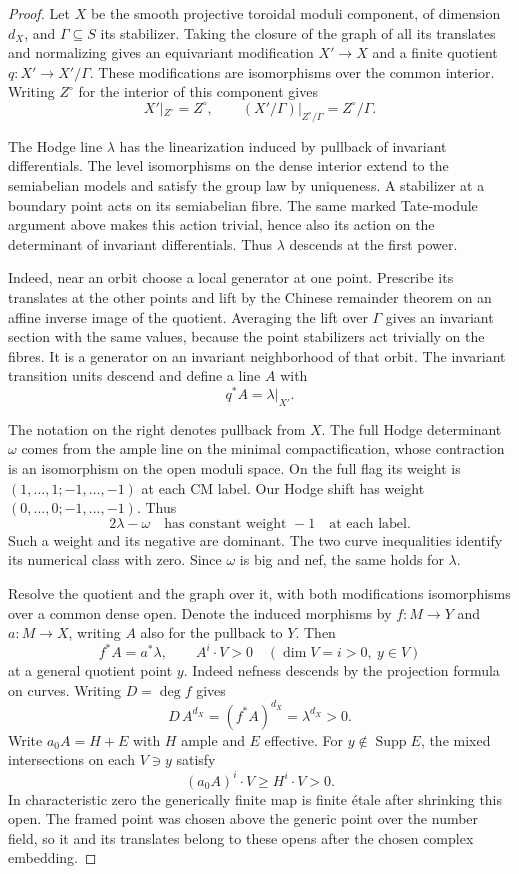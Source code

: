 \begin{proof}
Let \(X\) be the smooth projective toroidal moduli component, of
dimension \(d_X\), and \(\Gamma\subseteq S\) its stabilizer. Taking
the closure of the graph of all its translates and normalizing gives
an equivariant modification \(X'\to X\) and a finite quotient
\(q:X'\to X'/\Gamma\). These modifications are isomorphisms over
the common interior. Writing \(Z^\circ\) for the interior of this component gives
\[
 X'|_{Z^\circ}=Z^\circ,\qquad
 (X'/\Gamma)|_{Z^\circ/\Gamma}=Z^\circ/\Gamma .
\]

The Hodge line \(\lambda\) has the linearization induced by
pullback of invariant differentials. The level isomorphisms on the
dense interior extend to the semiabelian models and satisfy the group
law by uniqueness. \cite[I, Proposition~2.7]{faltings-chai}
A stabilizer at a boundary point acts on its semiabelian fibre.
The same marked Tate-module argument above makes this action trivial,
hence also its action on the determinant of invariant differentials.
Thus \(\lambda\) descends at the first power.

Indeed, near an orbit choose a local generator at one point. Prescribe
its translates at the other points and lift by the Chinese remainder
theorem on an affine inverse image of the quotient. Averaging the
lift over \(\Gamma\) gives an invariant section with the same values,
because the point stabilizers act trivially on the fibres. It is a
generator on an invariant neighborhood of that orbit. The invariant
transition units descend and define a line \(A\) with
\[
                 q^*A=\lambda|_{X'} .
\]

The notation on the right denotes pullback from \(X\).
The full Hodge determinant \(\omega\) comes from the ample line
on the minimal compactification, whose contraction is an isomorphism
on the open moduli space. On the full flag its weight is
\((1,\ldots,1;-1,\ldots,-1)\) at each CM label. Our Hodge
shift has weight \((0,\ldots,0;-1,\ldots,-1)\). Thus
\[
  2\lambda-\omega \quad\text{has constant weight }-1
            \quad\text{at each label}.
\]
Such a weight and its negative are dominant. The two curve
inequalities identify its numerical class with zero. Since
\(\omega\) is big and nef, the same holds for \(\lambda\).
\cite[Remark~16.2(2)]{lan-ramified-models}

Resolve the quotient and the graph over it, with both modifications
isomorphisms over a common dense open. Denote the induced morphisms
by \(f:M\to Y\) and \(a:M\to X\), writing \(A\) also for the
pullback to \(Y\). Then
\[
 f^*A=a^*\lambda,\qquad
 A^i\cdot V>0\quad(\dim V=i>0,\ y\in V)
\]
at a general quotient point \(y\). Indeed nefness descends by the
projection formula on curves. Writing \(D=\deg f\) gives
\[
         D\,A^{d_X}=(f^*A)^{d_X}=\lambda^{d_X}>0 .
\]
Write \(a_0 A=H+E\) with \(H\) ample and \(E\) effective.
For \(y\notin\operatorname{Supp} E\), the mixed intersections on
each \(V\ni y\) satisfy
\[
     (a_0 A)^i\cdot V\ge H^i\cdot V>0 .
\]
In characteristic zero the generically finite map is finite \'etale
after shrinking this open. The framed point was chosen above the
generic point over the number field, so it and its translates belong
to these opens after the chosen complex embedding.



\end{proof}
